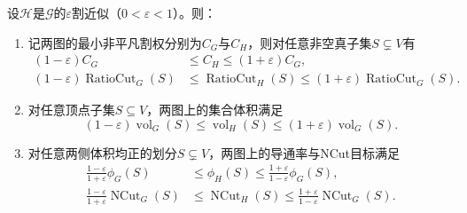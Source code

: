 \begin{theorem}[割近似保持的图划分量]
\label{prop:graph-cut-approximation-preservation}
设$\mathcal H$是$\mathcal G$的$\varepsilon$割近似（$0<\varepsilon<1$）。则：
\begin{enumerate}
  \item 记两图的最小非平凡割权分别为$C_G$与$C_H$，则对任意非空真子集$S\subsetneq V$有
  \begin{equation}
  \begin{aligned}
  (1-\varepsilon)C_G&\leq C_H\leq(1+\varepsilon)C_G,\\
  (1-\varepsilon)\operatorname{RatioCut}_G(S)
  &\leq\operatorname{RatioCut}_H(S)
  \leq(1+\varepsilon)\operatorname{RatioCut}_G(S).
  \end{aligned}
  \label{eq:graph-sparsification-min-cut}
  \end{equation}
  \item 对任意顶点子集$S\subseteq V$，两图上的集合体积满足
  \begin{equation}
  (1-\varepsilon)\operatorname{vol}_G(S)
  \leq \operatorname{vol}_H(S)
  \leq (1+\varepsilon)\operatorname{vol}_G(S).
  \label{eq:graph-sparsification-volume}
  \end{equation}
  \item 对任意两侧体积均正的划分$S\subsetneq V$，两图上的导通率与NCut目标满足
  \begin{equation}
  \begin{aligned}
  \frac{1-\varepsilon}{1+\varepsilon}\phi_G(S)
  &\leq \phi_H(S)
  \leq \frac{1+\varepsilon}{1-\varepsilon}\phi_G(S),\\
  \frac{1-\varepsilon}{1+\varepsilon}\operatorname{NCut}_G(S)
  &\leq \operatorname{NCut}_H(S)
  \leq \frac{1+\varepsilon}{1-\varepsilon}\operatorname{NCut}_G(S).
  \end{aligned}
  \label{eq:graph-sparsification-conductance}
  \end{equation}
\end{enumerate}
\end{theorem}

